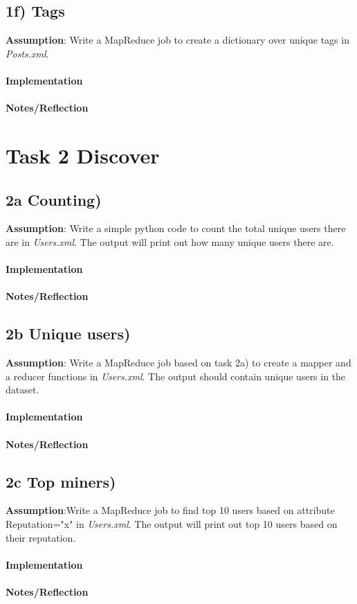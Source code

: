 \documentclass[fleqn,10pt]{wlscirep}
\begin{document}
\subsection*{1f) Tags}
\textbf{Assumption}: Write a MapReduce job to create a dictionary over unique tags in  \textit{Posts.xml}. \\ \\
\textbf{Implementation}  \\ \\
\textbf{Notes/Reflection}

\section*{Task 2 Discover}

\subsection*{2a Counting) }
\textbf{Assumption}: Write a simple python code to count the total unique users there are in \textit{Users.xml}. The output will print out how many unique users there are.\\ \\
\textbf{Implementation}  \\ \\
\textbf{Notes/Reflection}

\subsection*{2b Unique users) }
\textbf{Assumption}: Write a MapReduce job based on task 2a) to create a mapper  and a reducer functions in \textit{Users.xml}. The output should contain unique users in the dataset.  \\ \\
\textbf{Implementation}  \\ \\
\textbf{Notes/Reflection}

\subsection*{2c Top miners) }
\textbf{Assumption}:Write a MapReduce job to find top 10 users based on attribute Reputation="x" in \textit{Users.xml}. The output will print out top 10 users based on their reputation. \\ \\
\textbf{Implementation}  \\ \\
\textbf{Notes/Reflection}
\end{document}
